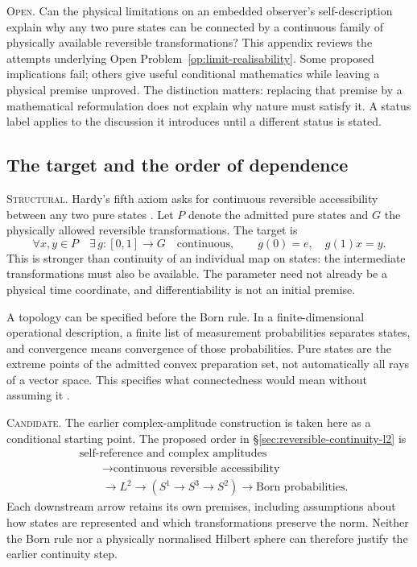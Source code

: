 \noindent\textsc{Open.}
Can the physical limitations on an embedded observer's self-description
explain why any two pure states can be connected by a continuous family of
physically available reversible transformations? This appendix reviews the
attempts underlying Open Problem~\ref{op:limit-realisability}. Some proposed
implications fail; others give useful conditional mathematics while leaving
a physical premise unproved. The distinction matters: replacing that
premise by a mathematical reformulation does not explain why nature must
satisfy it. A status label applies to the discussion it introduces until
a different status is stated.

\subsection{The target and the order of dependence}
\label{app:continuity-target}

\noindent\textsc{Structural.}
Hardy's fifth axiom asks for continuous reversible accessibility between
any two pure states \autocite{Hardy2001a}. Let $P$ denote the admitted pure
states and $G$ the physically allowed reversible transformations. The target is
\begin{equation}
  \forall x,y\in P\quad\exists\,g:[0,1]\longrightarrow G
  \quad\text{continuous},\qquad g(0)=e,\quad g(1)x=y.
  \label{eq:continuity-accessibility}
\end{equation}
This is stronger than continuity of an individual map on states: the
intermediate transformations must also be available. The parameter need
not already be a physical time coordinate, and differentiability is not
an initial premise.

A topology can be specified before the Born rule. In a finite-dimensional
operational description, a finite list of measurement probabilities
separates states, and convergence means convergence of those probabilities.
Pure states are the extreme points of the admitted convex preparation set,
not automatically all rays of a vector space. This specifies what
connectedness would mean without assuming it \autocite{Hardy2001a}.

\noindent\textsc{Candidate.}
The earlier complex-amplitude construction is taken here as a conditional
starting point. The proposed order in \S\ref{sec:reversible-continuity-l2} is
\begin{equation}
\begin{aligned}
 &\text{self-reference and complex amplitudes}\\
 &\qquad\longrightarrow\text{continuous reversible accessibility}\\
 &\qquad\longrightarrow L^2
   \longrightarrow (S^1\longrightarrow S^3\longrightarrow S^2)
   \longrightarrow\text{Born probabilities}.
\end{aligned}
\label{eq:continuity-dependency}
\end{equation}
Each downstream arrow retains its own premises, including assumptions
about how states are represented and which transformations preserve the norm. Neither the
Born rule nor a physically normalised Hilbert sphere can therefore justify
the earlier continuity step.

